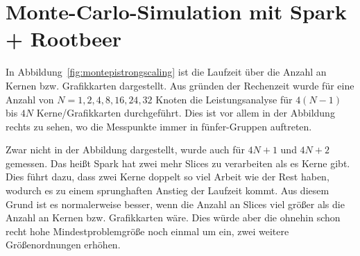 \section{Monte-Carlo-Simulation mit Spark + Rootbeer}


In Abbildung~\ref{fig:montepistrongscaling} ist die Laufzeit über die Anzahl an Kernen bzw. Grafikkarten dargestellt. Aus gründen der Rechenzeit wurde für eine Anzahl von $N=1,2,4,8,16,24,32$ Knoten die Leistungsanalyse für $4(N-1)$ bis $4N$ Kerne/Grafikkarten durchgeführt. Dies ist vor allem in der Abbildung rechts zu sehen, wo die Messpunkte immer in fünfer-Gruppen auftreten.

Zwar nicht in der Abbildung dargestellt, wurde auch für $4N+1$ und $4N+2$ gemessen. Das heißt Spark hat zwei mehr Slices zu verarbeiten als es Kerne gibt. Dies führt dazu, dass zwei Kerne doppelt so viel Arbeit wie der Rest haben, wodurch es zu einem sprunghaften Anstieg der Laufzeit kommt. Aus diesem Grund ist es normalerweise besser, wenn die Anzahl an Slices viel größer als die Anzahl an Kernen bzw. Grafikkarten wäre. Dies würde aber die ohnehin schon recht hohe Mindestproblemgröße noch einmal um ein, zwei weitere Größenordnungen erhöhen.

